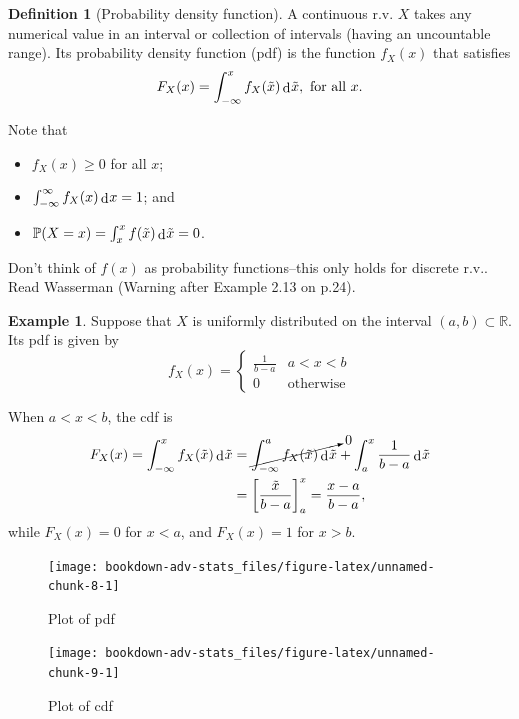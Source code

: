 \documentclass[
]{book}
\providecommand{\tightlist}{%
  \setlength{\itemsep}{0pt}\setlength{\parskip}{0pt}}
\newcommand{\bbR}{\mathbb{R}}
\newcommand{\bbP}{\mathbb{P}}
\DeclareMathOperator{\dd}{d}
\newcommand{\dint}{\dd\hspace{0.5pt}\!}
\theoremstyle{definition}
\newtheorem{definition}{Definition}[chapter]
\theoremstyle{definition}
\newtheorem{example}{Example}[chapter]
\theoremstyle{definition}
\theoremstyle{definition}
\theoremstyle{remark}
\begin{document}
\begin{definition}[Probability density function]
A continuous r.v. \(X\) takes any numerical value in an interval or collection of intervals (having an uncountable range).
Its probability density function (pdf) is the function \(f_X(x)\) that satisfies
\[
F_X(x) = \int_{-\infty}^x f_X(\tilde x) \dint \tilde x, \text{ for all } x.
\]
\end{definition}

Note that

\begin{itemize}
\tightlist
\item
  \(f_X(x) \geq 0\) for all \(x\);
\item
  \(\int_{-\infty}^\infty f_X(x) \dint x = 1\); and
\item
  \(\bbP(X=x) = \int_x^x f(\tilde x) \dint \tilde x = 0\).
\end{itemize}

Don't think of \(f(x)\) as probability functions--this only holds for discrete r.v..
Read Wasserman (Warning after Example 2.13 on p.24).

\begin{example}

Suppose that \(X\) is uniformly distributed on the interval \((a,b) \subset \bbR\).
Its pdf is given by
\[
f_X(x) = \begin{cases}
\frac{1}{b-a} & a < x < b \\
0 & \text{otherwise}
\end{cases}
\]

When \(a < x < b\), the cdf is
\begin{align*}
F_X(x) 
= \int_{-\infty}^x f_X(\tilde x) \dint \tilde x 
&=\cancelto{0}{\int_{-\infty}^a f_X(\tilde x) \dint \tilde x}  + \int_{a}^x \frac{1}{b-a} \dint \tilde x \\
&= \left[ \frac{\tilde x}{b-a} \right]_a^x = \frac{x-a}{b-a},
\end{align*}
while \(F_X(x) = 0\) for \(x<a\), and \(F_X(x)=1\) for \(x>b\).

\begin{figure}

{\centering \texttt{[image: bookdown-adv-stats\_files/figure-latex/unnamed-chunk-8-1]} 

}

\caption{Plot of pdf}\label{fig:unnamed-chunk-8}
\end{figure}

\begin{figure}

{\centering \texttt{[image: bookdown-adv-stats\_files/figure-latex/unnamed-chunk-9-1]} 

}

\caption{Plot of cdf}\label{fig:unnamed-chunk-9}
\end{figure}

\end{example}
\end{document}
